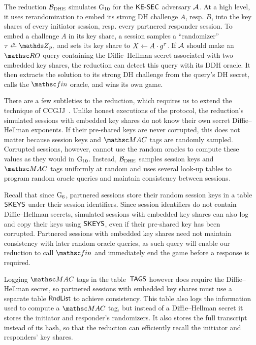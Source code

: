 The reduction $\mathcal{B}_{\mathrm{DHE}}$ simulates $\textnormal{G}_{10}$ for the $\mathsf{KE{\text{\normalfont-}}SEC}$ adversary $\mathcal{A}$.
At a high level, it uses rerandomization to embed its strong DH challenge $A$, resp. $B$, into the key shares of every initiator session, resp. every partnered responder session.
To embed a challenge $A$ in its key share, a session samples a ``randomizer'' $\tau \sample \Z_p$, and sets its key share to $X \gets A \cdot g^{\tau}$. 
If $\mathcal{A}$ should make an $\RO$ query containing the Diffie--Hellman secret associated with two embedded key shares, the reduction can detect this query with its DDH oracle.
It then extracts the solution to its strong DH challenge from the query's DH secret, calls the $\Finalize$ oracle, and wins its own game.

There are a few subtleties to the reduction, which requires us to extend the technique of CCGJJ~\cite{C:CCGJJ19}.
Unlike honest executions of the protocol, the reduction's simulated sessions with embedded key shares do not know their own secret Diffie--Hellman exponents.
If their pre-shared keys are never corrupted, this does not matter because session keys and $\MAC$ tags are randomly sampled.
Corrupted sessions, however, cannot use the random oracles to compute these values as they would in $\textnormal{G}_{10}$.
%
Instead, $\mathcal{B}_{\mathrm{DHE}}$ samples session keys and $\MAC$ tags uniformly at random and uses several look-up tables to program random oracle queries and maintain consistency between sessions.

\iffull
Recall that since $\textnormal{G}_6$, partnered sessions store their random session keys in a table $\mathsf{SKEYS}$ under their session identifiers.
Since session identifiers do not contain Diffie--Hellman secrets, simulated sessions with embedded key shares can also log and copy their keys using $\mathsf{SKEYS}$, even if their pre-shared key has been corrupted.
Partnered sessions with embedded key shares need not maintain consistency with later random oracle queries, as such query will enable our reduction to call $\Finalize$ and immediately end the game before a response is required.

Logging $\MAC$ tags in the table~$\mathsf{TAGS}$ however does require the Diffie--Hellman secret, so partnered sessions with embedded key shares must use a separate table $\mathsf{RndList}$ to achieve consistency.
This table also logs the information used to compute a $\MAC$ tag, but instead of a Diffie--Hellman secret it stores the initiator and responder's randomizers.
It also stores the full transcript instead of its hash, so that the reduction can efficiently recall the initiator and responders' key shares.
\fi

